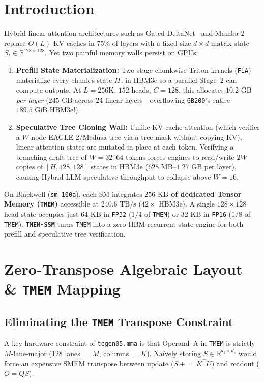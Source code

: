 \documentclass[conference,10pt]{IEEEtran}
\begin{document}
\section{Introduction}
Hybrid linear-attention architectures such as Gated DeltaNet~\cite{yang2024gateddeltanet} and Mamba-2~\cite{dao2024mamba2} replace $O(L)$ KV caches in $75\%$ of layers with a fixed-size $d{\times}d$ matrix state $S_t \in \mathbb{R}^{128\times 128}$. Yet two painful memory walls persist on GPUs:
\begin{enumerate}
    \item \textbf{Prefill State Materialization:} Two-stage chunkwise Triton kernels (\texttt{FLA}) materialize every chunk's state $H_c$ in HBM3e so a parallel Stage~2 can compute outputs. At $L{=}256\text{K}$, $152$ heads, $C{=}128$, this allocates $10.2\text{ GB}$ \emph{per layer} ($245\text{ GB}$ across 24 linear layers---overflowing \texttt{GB200}'s entire $189.5\text{ GiB}$ HBM3e!).
    \item \textbf{Speculative Tree Cloning Wall:} Unlike KV-cache attention (which verifies a $W$-node EAGLE-2/Medusa tree via a tree mask without copying KV), linear-attention states are mutated in-place at each token. Verifying a branching draft tree of $W{=}32$--$64$ tokens forces engines to read/write $2W$ copies of $[H, 128, 128]$ states in HBM3e ($628\text{ MB}$--$1.27\text{ GB}$ per layer), causing Hybrid-LLM speculative throughput to collapse above $W{=}16$.
\end{enumerate}

On Blackwell (\texttt{sm\_100a}), each SM integrates \textbf{$256\text{ KB}$ of dedicated Tensor Memory (\texttt{TMEM})} accessible at \textbf{$240.6\text{ TB/s}$} ($42\times$ HBM3e). A single $128{\times}128$ head state occupies just $64\text{ KB}$ in \texttt{FP32} ($1/4$ of \texttt{TMEM}) or $32\text{ KB}$ in \texttt{FP16} ($1/8$ of \texttt{TMEM}). \textbf{\texttt{TMEM-SSM}} turns \texttt{TMEM} into a zero-HBM recurrent state engine for both prefill and speculative tree verification.

\section{Zero-Transpose Algebraic Layout \& \texttt{TMEM} Mapping}

\subsection{Eliminating the \texttt{TMEM} Transpose Constraint}
A key hardware constraint of \texttt{tcgen05.mma} is that Operand~A in \texttt{TMEM} is strictly $M$-lane-major ($128$ lanes $= M$, columns $= K$). Na\"ively storing $S \in \mathbb{R}^{d_k \times d_v}$ would force an expensive SMEM transpose between update ($S \mathrel{+}= K^\top U$) and readout ($O = Q S$).
\end{document}
